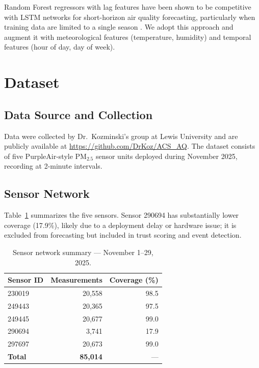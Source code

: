 \documentclass[11pt, letterpaper]{article}
\begin{document}
Random Forest regressors with lag features have been shown to be competitive
with LSTM networks for short-horizon air quality forecasting, particularly when
training data are limited to a single season \cite{chen2021}.
We adopt this approach and augment it with meteorological features (temperature,
humidity) and temporal features (hour of day, day of week).

\section{Dataset}

\subsection{Data Source and Collection}

Data were collected by Dr.\ Kozminski's group at Lewis University and are
publicly available at \url{https://github.com/DrKoz/ACS_AQ}.
The dataset consists of five PurpleAir-style PM$_{2.5}$ sensor units deployed
during November 2025, recording at 2-minute intervals.

\subsection{Sensor Network}

Table~\ref{tab:sensors} summarizes the five sensors.
Sensor 290694 has substantially lower coverage (17.9\%), likely due to a
deployment delay or hardware issue; it is excluded from forecasting but
included in trust scoring and event detection.

\begin{table}[h!]
\centering
\caption{Sensor network summary --- November 1--29, 2025.}
\label{tab:sensors}
\begin{tabular}{lrr}
\toprule
\textbf{Sensor ID} & \textbf{Measurements} & \textbf{Coverage (\%)} \\
\midrule
230019 & 20,558 & 98.5 \\
249443 & 20,365 & 97.5 \\
249445 & 20,677 & 99.0 \\
290694 & 3,741  & 17.9 \\
297697 & 20,673 & 99.0 \\
\midrule
\textbf{Total} & \textbf{85,014} & --- \\
\bottomrule
\end{tabular}
\end{table}
\end{document}
